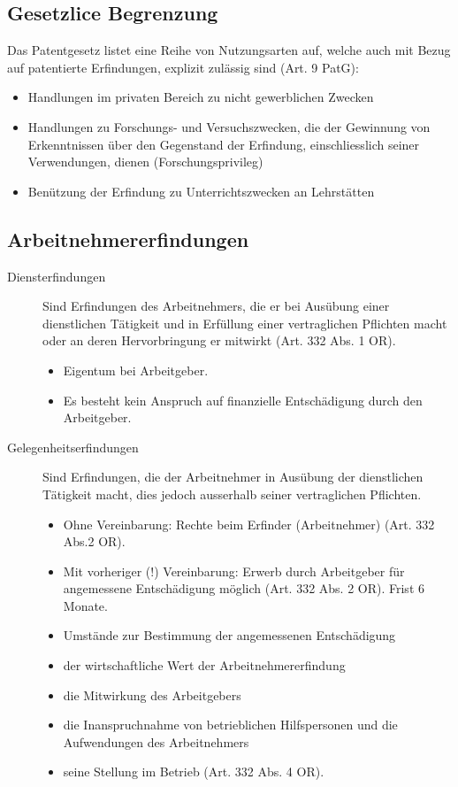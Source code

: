 \subsection{Gesetzlice Begrenzung}

Das Patentgesetz listet eine Reihe von Nutzungsarten auf, welche auch
mit Bezug auf patentierte Erfindungen, explizit zulässig sind (Art. 9
PatG):
\begin{itemize}
	\tightlist
	\item Handlungen im privaten Bereich zu nicht gewerblichen Zwecken
	\item Handlungen zu Forschungs- und Versuchszwecken, die der Gewinnung von
	Erkenntnissen über den Gegenstand der Erfindung, einschliesslich seiner
	Verwendungen, dienen (Forschungsprivileg)
	\item Benützung der Erfindung zu
	Unterrichtszwecken an Lehrstätten
\end{itemize}

\subsection{Arbeitnehmererfindungen}

\begin{description}
	\item[Diensterfindungen] Sind Erfindungen des Arbeitnehmers, die er
	bei Ausübung einer dienstlichen Tätigkeit und in Erfüllung einer
	vertraglichen Pflichten macht oder an deren Hervorbringung er mitwirkt
	(Art. 332 Abs. 1 OR).
	\begin{itemize}
		\item Eigentum bei Arbeitgeber.
		\item Es besteht kein Anspruch auf finanzielle Entschädigung
		durch den Arbeitgeber.
	\end{itemize}
	\item[Gelegenheitserfindungen] Sind Erfindungen, die der Arbeitnehmer
	in Ausübung der dienstlichen Tätigkeit macht, dies jedoch ausserhalb
	seiner vertraglichen Pflichten.
	\begin{itemize}
		\tightlist
		\item Ohne Vereinbarung: Rechte beim Erfinder (Arbeitnehmer) (Art. 332 Abs.2
		OR).
		\item Mit vorheriger (!) Vereinbarung: Erwerb durch Arbeitgeber für
		angemessene Entschädigung möglich (Art. 332 Abs. 2 OR). Frist 6
		Monate.
		\item Umstände zur Bestimmung der angemessenen Entschädigung
		\item der wirtschaftliche Wert der Arbeitnehmererfindung
		\item die Mitwirkung des Arbeitgebers
		\item die Inanspruchnahme von betrieblichen Hilfspersonen und die
		Aufwendungen des Arbeitnehmers
		\item seine Stellung im Betrieb (Art. 332 Abs. 4 OR).
	\end{itemize}
\end{description}

